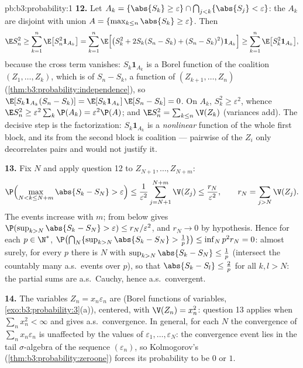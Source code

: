 \begin{solution}{pb:b3:probability:1}
\textbf{12.} Let $A_k = \{\abs{S_k} \geq \varepsilon\} \cap
\bigcap_{j<k}\{\abs{S_j} < \varepsilon\}$: the $A_k$ are
disjoint with union $A = \{\max_{k\leq n}\abs{S_k} \geq
\varepsilon\}$. Then
\[
\E S_n^2 \geq \sum_{k=1}^n\E\bigl[S_n^2\mathbf 1_{A_k}\bigr]
= \sum_{k=1}^n\E\Bigl[\bigl(S_k^2 + 2S_k(S_n - S_k) + (S_n
- S_k)^2\bigr)\mathbf 1_{A_k}\Bigr]
\geq \sum_{k=1}^n\E\bigl[S_k^2\mathbf 1_{A_k}\bigr],
\]
because the cross term vanishes: $S_k\mathbf 1_{A_k}$ is a
Borel function of the coalition $(Z_1, \dots, Z_k)$, which
is  of $S_n - S_k$, a function of $(Z_{k+1},
\dots, Z_n)$ (\cref{thm:b3:probability:independence}), so
$\E[S_k\mathbf 1_{A_k}(S_n - S_k)] = \E[S_k\mathbf
1_{A_k}]\,\E[S_n - S_k] = 0$. On $A_k$, $S_k^2 \geq
\varepsilon^2$, whence $\E S_n^2 \geq
\varepsilon^2\sum_k\P(A_k) = \varepsilon^2\P(A)$; and $\E
S_n^2 = \sum_{k\leq n}\V(Z_k)$ (variances add). The
decisive step is the factorization: $S_k\mathbf 1_{A_k}$ is
a \emph{nonlinear} function of the whole first block, and
its  from the second block is coalition
 --- pairwise  of the $Z_i$ only
decorrelates pairs and would not justify it.

\textbf{13.} Fix $N$ and apply question 12 to $Z_{N+1},
\dots, Z_{N+m}$:
\[
\P\Bigl(\max_{N < k \leq N+m}\abs{S_k - S_N} >
\varepsilon\Bigr) \leq
\frac1{\varepsilon^2}\sum_{j=N+1}^{N+m}\V(Z_j) \leq
\frac{r_N}{\varepsilon^2},
\qquad r_N = \sum_{j>N}\V(Z_j) .
\]
The events increase with $m$;  from below gives
$\P(\sup_{k>N}\abs{S_k - S_N} > \varepsilon) \leq
r_N/\varepsilon^2$, and $r_N \to 0$ by hypothesis. Hence
for each $p \in \N^*$, $\P\bigl(\bigcap_N\{\sup_{k>N}
\abs{S_k - S_N} > \frac1p\}\bigr) \leq \inf_Np^2r_N = 0$:
almost surely, for every $p$ there is $N$ with
$\sup_{k>N}\abs{S_k - S_N} \leq \frac1p$ (intersect the
countably many a.s.\ events over $p$), so that $\abs{S_k -
S_l} \leq \frac2p$ for all $k, l > N$: the partial sums
are a.s.\ Cauchy, hence a.s.\ convergent.

\textbf{14.} The variables $Z_n = x_n\varepsilon_n$ are
 (Borel functions of  variables,
\cref{exo:b3:probability:3}(a)), centered, with $\V(Z_n) =
x_n^2$: question 13 applies when $\sum_nx_n^2 < \infty$ and
gives a.s.\ convergence. In general, for each $N$ the
convergence of $\sum_nx_n\varepsilon_n$ is unaffected by
the values of $\varepsilon_1, \dots, \varepsilon_N$: the
convergence event lies in the tail $\sigma$-algebra of the
 sequence $(\varepsilon_n)$, so Kolmogorov's
 (\cref{thm:b3:probability:zeroone}) forces
its probability to be $0$ or $1$.


\end{solution}
